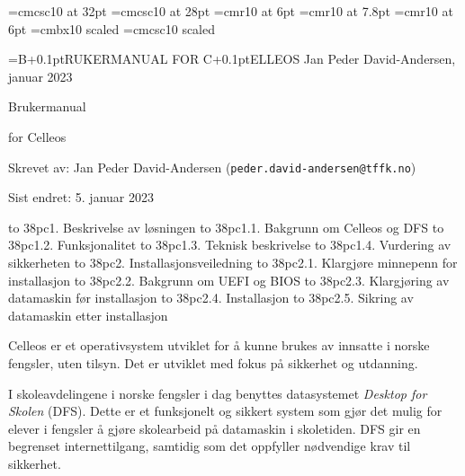 



\font\ftitteltop=cmcsc10 at 32pt
\font\ftittelbottom=cmcsc10 at 28pt
\font\ftopptekst=cmr10 at 6pt
\font\ftopptekststor=cmr10 at 7.8pt
\font\fforfatter=cmr10 at 6pt
\font\fs=cmbx10 scaled
\font\fss=cmcsc10 scaled

\headline={\ftopptekststor B\kern+0.1pt{\ftopptekst RUKERMANUAL FOR } C\kern+0.1pt{\ftopptekst ELLEOS \hfill Jan Peder David-Andersen, januar 2023}}

\topglue 6pc
\centerline{\ftitteltop Brukermanual}
\vskip 10pt
\centerline{\ftittelbottom for Celleos}
\vskip 8pc

\noindent Skrevet av: Jan Peder David-Andersen ({\tt peder.david-andersen@tffk.no})

\noindent Sist endret: 5. januar 2023

\vskip 3pc
\def\tocwidth{38pc}



\hbox to \tocwidth{1. Beskrivelse av l\o sningen }
\hbox to \tocwidth{1.1. Bakgrunn om Celleos og DFS }
\hbox to \tocwidth{1.2. Funksjonalitet }
\hbox to \tocwidth{1.3. Teknisk beskrivelse }
\hbox to \tocwidth{1.4. Vurdering av sikkerheten }
\vskip 4pt
\hbox to \tocwidth{2. Installasjonsveiledning }
\hbox to \tocwidth{2.1. Klargj\o re minnepenn for installasjon }
\hbox to \tocwidth{2.2. Bakgrunn om UEFI og BIOS }
\hbox to \tocwidth{2.3. Klargj\o ring av datamaskin f\o r installasjon }
\hbox to \tocwidth{2.4. Installasjon }
\hbox to \tocwidth{2.5. Sikring av datamaskin etter installasjon }

\vfill\eject

\topglue 1pc

Celleos er et operativsystem utviklet for \aa{} kunne brukes av innsatte i norske fengsler, uten tilsyn. Det er utviklet med fokus p\aa{} sikkerhet og utdanning.



I skoleavdelingene i norske fengsler i dag benyttes datasystemet {\it Desktop for Skolen} (DFS). Dette er et funksjonelt og sikkert system som gj\o r det mulig for elever i fengsler \aa{} gj\o re skolearbeid p\aa{} datamaskin i skoletiden. DFS gir en begrenset internettilgang, samtidig som det oppfyller n\o dvendige krav til sikkerhet.

